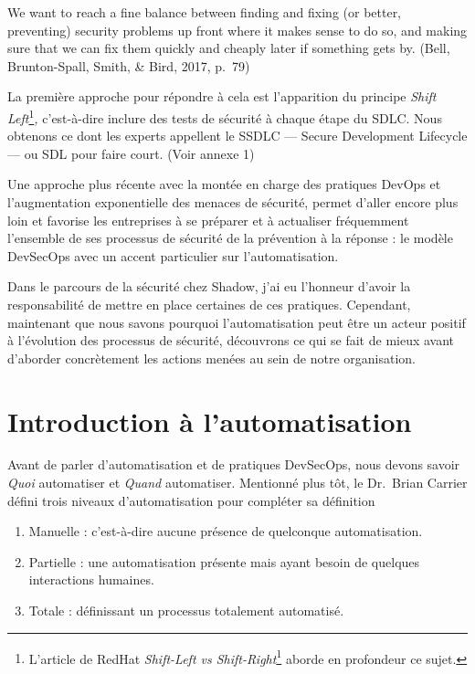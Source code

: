 \documentclass[
  11pt,
  a4paper,
  krantz2,
  11pt,
  oneside]{krantz}
\renewenvironment{quote}{\begin{VF}}{\end{VF}}
\renewcommand{\href}[2]{#2\footnote{\url{#1}}}
\begin{document}
\begin{quote}
We want to reach a fine balance between finding and fixing (or better, preventing) security problems up front where it makes sense to do so, and making sure that we can fix them quickly and cheaply later if something gets by. (Bell, Brunton-Spall, Smith, \& Bird, 2017, p.~79)
\end{quote}

La première approche pour répondre à cela est l'apparition du principe \emph{Shift Left}\footnote{L'article de RedHat \href{https://www.redhat.com/en/topics/devops/shift-left-vs-shift-right}{\emph{Shift-Left vs Shift-Right}} aborde en profondeur ce sujet.}\emph{,} c'est-à-dire inclure des tests de sécurité à chaque étape du SDLC. Nous obtenons ce dont les experts appellent le SSDLC --- Secure Development Lifecycle --- ou SDL pour faire court. (Voir annexe 1)

Une approche plus récente avec la montée en charge des pratiques DevOps et l'augmentation exponentielle des menaces de sécurité, permet d'aller encore plus loin et favorise les entreprises à se préparer et à actualiser fréquemment l'ensemble de ses processus de sécurité de la prévention à la réponse : le modèle DevSecOps avec un accent particulier sur l'automatisation.

Dans le parcours de la sécurité chez Shadow, j'ai eu l'honneur d'avoir la responsabilité de mettre en place certaines de ces pratiques. Cependant, maintenant que nous savons pourquoi l'automatisation peut être un acteur positif à l'évolution des processus de sécurité, découvrons ce qui se fait de mieux avant d'aborder concrètement les actions menées au sein de notre organisation.

\section{Introduction à l'automatisation}\label{introduction-uxe0-lautomatisation}

Avant de parler d'automatisation et de pratiques DevSecOps, nous devons savoir \emph{Quoi} automatiser et \emph{Quand} automatiser. Mentionné plus tôt, le Dr.~Brian Carrier défini trois niveaux d'automatisation pour compléter sa définition

\begin{enumerate}
\def\labelenumi{\arabic{enumi}.}
\item
  Manuelle : c'est-à-dire aucune présence de quelconque automatisation.
\item
  Partielle : une automatisation présente mais ayant besoin de quelques interactions humaines.
\item
  Totale : définissant un processus totalement automatisé.
\end{enumerate}
\end{document}
